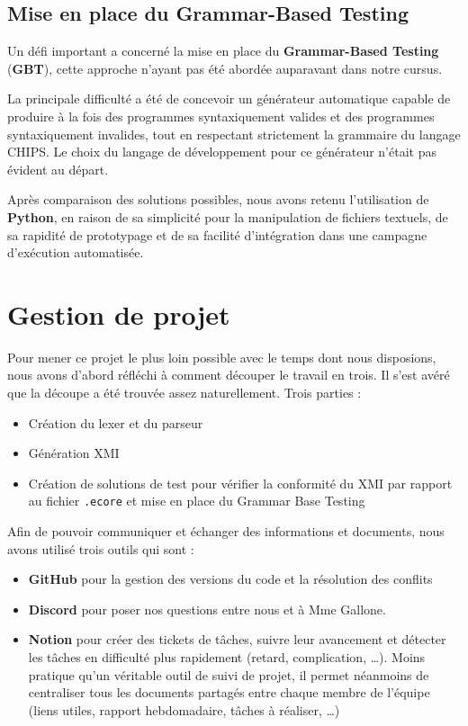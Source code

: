 \documentclass[a4paper, 11pt]{article}
\DeclareRobustCommand{\prog}[1]{\begingroup\urlstyle{tt}\nolinkurl{#1}\endgroup}
\newcommand{\kw}[1]{\textbf{#1}}
\begin{document}
\subsection{Mise en place du Grammar-Based Testing}

Un défi important a concerné la mise en place du \kw{Grammar-Based Testing} (\kw{GBT}), cette approche n’ayant pas été abordée auparavant dans notre cursus.

La principale difficulté a été de concevoir un générateur automatique capable de produire à la fois des programmes syntaxiquement valides et des programmes syntaxiquement invalides, tout en respectant strictement la grammaire du langage CHIPS. Le choix du langage de développement pour ce générateur n’était pas évident au départ.

Après comparaison des solutions possibles, nous avons retenu l’utilisation de \kw{Python}, en raison de sa simplicité pour la manipulation de fichiers textuels, de sa rapidité de prototypage et de sa facilité d’intégration dans une campagne d’exécution automatisée.

\section{Gestion de projet}
\label{sec:gestion}

Pour mener ce projet le plus loin possible avec le temps dont nous disposions, nous avons d'abord réfléchi à comment découper le travail en trois. Il s'est avéré que la découpe a été trouvée assez naturellement. Trois parties :

\begin{itemize}
\item Création du lexer et du parseur

\item Génération XMI

\item Création de solutions de test pour vérifier la conformité du XMI par rapport au fichier \prog{.ecore} et mise en place du Grammar Base Testing
\end{itemize}

Afin de pouvoir communiquer et échanger des informations et documents, nous avons utilisé trois outils qui sont :

\begin{itemize}
\item \textbf{GitHub} pour la gestion des versions du code et la résolution des conflits

\item \textbf{Discord} pour poser nos questions entre nous et à Mme Gallone.

\item \textbf{Notion} pour créer des tickets de tâches, suivre leur avancement et détecter les tâches en difficulté plus rapidement (retard, complication, …). Moins pratique qu'un véritable outil de suivi de projet, il permet néanmoins de centraliser tous les documents partagés entre chaque membre de l'équipe (liens utiles, rapport hebdomadaire, tâches à réaliser, …)

\end{itemize}
\end{document}
